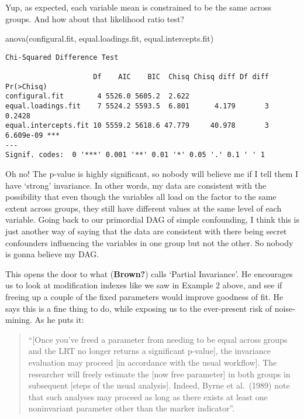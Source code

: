 \documentclass[
  letterpaper,
  DIV=11,
  numbers=noendperiod]{scrreprt}
\newenvironment{Shaded}{\begin{snugshade}}{\end{snugshade}}
\newcommand{\FunctionTok}[1]{\textcolor[rgb]{0.28,0.35,0.67}{#1}}
\newcommand{\NormalTok}[1]{\textcolor[rgb]{0.00,0.23,0.31}{#1}}
\begin{document}
Yup, as expected, each variable mean is constrained to be the same
across groups. And how about that likelihood ratio test?

\begin{Shaded}
\begin{Highlighting}[]
\FunctionTok{anova}\NormalTok{(configural.fit, equal.loadings.fit, equal.intercepts.fit)}
\end{Highlighting}
\end{Shaded}

\begin{verbatim}
Chi-Squared Difference Test

                     Df    AIC    BIC  Chisq Chisq diff Df diff Pr(>Chisq)    
configural.fit        4 5526.0 5605.2  2.622                                  
equal.loadings.fit    7 5524.2 5593.5  6.801      4.179       3     0.2428    
equal.intercepts.fit 10 5559.2 5618.6 47.779     40.978       3  6.609e-09 ***
---
Signif. codes:  0 '***' 0.001 '**' 0.01 '*' 0.05 '.' 0.1 ' ' 1
\end{verbatim}

Oh no! The p-value is highly significant, so nobody will believe me if I
tell them I have `strong' invariance. In other words, my data are
consistent with the possibility that even though the variables all load
on the factor to the same extent across groups, they still have
different values at the same level of each variable. Going back to our
primordial DAG of simple confounding, I think this is just another way
of saying that the data are consistent with there being secret
confounders influencing the variables in one group but not the other. So
nobody is gonna believe my DAG.

This opens the door to what (\textbf{Brown?}) calls `Partial
Invariance'. He encourages us to look at modification indexes like we
saw in Example 2 above, and see if freeing up a couple of the fixed
parameters would improve goodness of fit. He says this is a fine thing
to do, while exposing us to the ever-present risk of noise-mining. As he
puts it:

\begin{quote}
``{[}Once you've freed a parameter from needing to be equal across
groups and the LRT no longer returns a significant p-value{]}, the
invariance evaluation may proceed {[}in accordance with the usual
workflow{]}. The researcher will freely estimate the {[}now free
parameter{]} in both groups in subsequent {[}steps of the usual
analysis{]}. Indeed, Byrne et al.~(1989) note that such analyses may
proceed as long as there exists at least one noninvariant parameter
other than the marker indicator''.
\end{quote}
\end{document}
